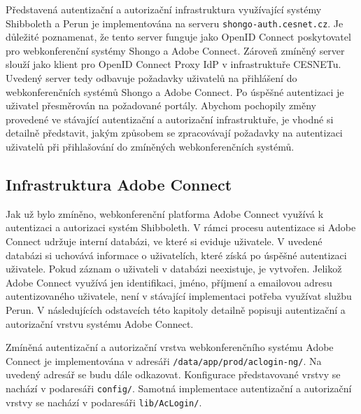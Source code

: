 \documentclass[
  printed, %
  twoside, %
  table,   %
  nolof,     %
  nolot,     %
]{fithesis3}
\begin{document}
Představená autentizační a autorizační infrastruktura využívající systémy Shibboleth a Perun je implementována na serveru \texttt{shongo-auth.cesnet.cz}. Je důležité poznamenat, že tento server funguje jako OpenID Connect poskytovatel pro webkonferenční systémy Shongo a Adobe Connect. Zároveň zmíněný server slouží jako klient pro OpenID Connect Proxy IdP v infrastruktuře CESNETu. Uvedený server tedy odbavuje požadavky uživatelů na přihlášení do webkonferenčních systémů Shongo a Adobe Connect. Po úspěšné autentizaci je uživatel přesměrován na požadované portály. Abychom pochopily změny provedené ve stávající autentizační a autorizační infrastruktuře, je vhodné si detailně představit, jakým způsobem se zpracovávají požadavky na autentizaci uživatelů při přihlašování do zmíněných webkonferenčních systémů.  

\subsection{Infrastruktura Adobe Connect}
Jak už bylo zmíněno, webkonferenční platforma Adobe Connect využívá k autentizaci a
autorizaci systém Shibboleth. V rámci procesu autentizace si Adobe Connect udržuje interní databázi, ve které si eviduje uživatele. V
uvedené databázi si uchovává informace o uživatelích,
které získá po úspěšné autentizaci uživatele. Pokud záznam o uživateli
v databázi neexistuje, je vytvořen. Jelikož Adobe Connect využívá jen
identifikaci, jméno, příjmení a emailovou adresu autentizovaného uživatele, není v stávající implementaci
potřeba využívat službu Perun. V následujících odstavcích této kapitoly detailně popisuji autentizační a autorizační vrstvu systému Adobe Connect. \par

Zmíněná autentizační a autorizační vrstva webkonferenčního systému Adobe Connect je implementována v adresáři \texttt{/data/app/prod/aclogin-ng/}. Na uvedený adresář se budu dále odkazovat. Konfigurace představované vrstvy se nachází v podaresáři \texttt{config/}. Samotná implementace autentizační a autorizační vrstvy se nachází v podaresáři \texttt{lib/AcLogin/}. \par
\end{document}
